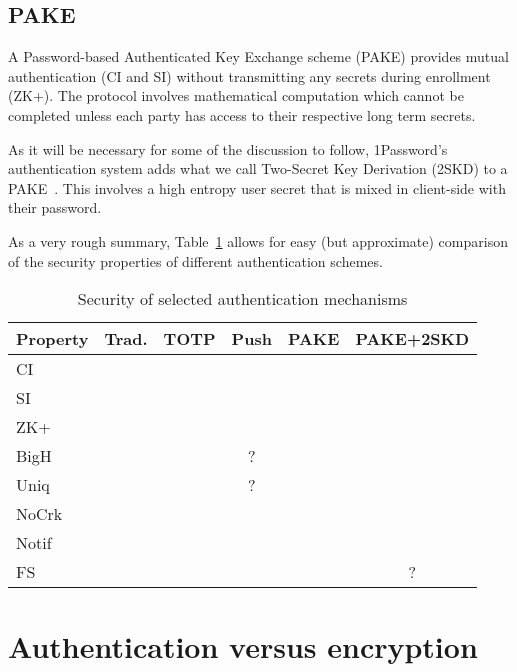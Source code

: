 \documentclass{soups}
\newcommand{\cmark}{\ding{51}}%
\newcommand{\xmark}{\ding{53}}%
\newcommand{\prop}[1]{\textsf{#1}}
\begin{document}
\subsection{PAKE}
A Password-based Authenticated Key Exchange scheme (PAKE) provides mutual authentication (\prop{CI} and \prop{SI}) without transmitting any secrets during enrollment (\prop{ZK+}). The protocol involves mathematical computation which cannot be completed unless each party has access to their respective long term secrets.

As it will be necessary for some of the discussion to follow,
1Password's authentication system adds what we call
Two-Secret Key Derivation (2SKD) to a PAKE~\autocite{1Password:whitepaper}.
This involves a
high entropy user secret that is mixed in client-side with their password.

As a very rough summary, Table~\ref{tab:props} allows for easy
(but approximate) comparison of the security properties of different
authentication schemes.

\begin{table}
  \caption{Security of selected authentication mechanisms}\label{tab:props}
  \begin{tabular}{lccccc}
    \textbf{Property} & \textbf{Trad.}   & \textbf{TOTP}    & \textbf{Push}    & \textbf{PAKE}   & \textbf{PAKE+2SKD} \\
    \hline
    \prop{CI}       & \cmark  & \cmark  & \cmark  & \cmark  & \cmark \\
    \prop{SI}       & \xmark  & \xmark  & \xmark  & \cmark  & \cmark \\
    \prop{ZK+}      & \xmark  & \cmark  & \cmark  & \cmark  & \cmark \\
    \prop{BigH}     & \xmark  & \cmark  & ?       & \xmark  & \cmark \\
    \prop{Uniq}     & \xmark  & \cmark  & ?       & \xmark  & \cmark \\
    \prop{NoCrk}    & \xmark  & \xmark  & \xmark  & \xmark  & \cmark \\
    \prop{Notif}    & \xmark  & \xmark  & \cmark  & \xmark  & \xmark \\
    \prop{FS}       & \xmark  & \cmark  & \cmark  & \xmark  & ?
  \end{tabular}
\end{table}

\section{Authentication versus encryption}
\end{document}
